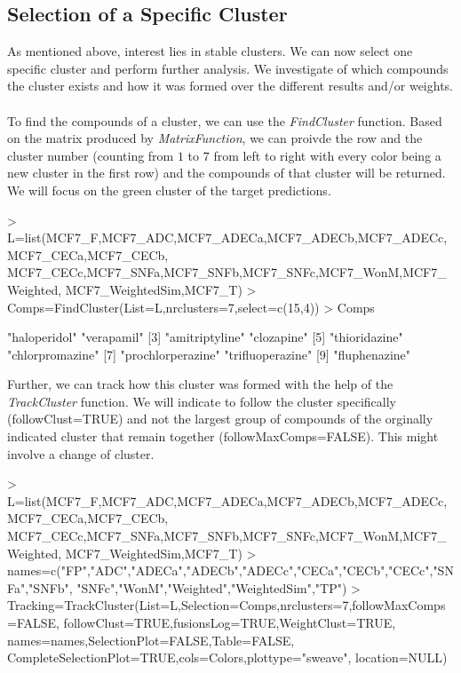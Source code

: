 \documentclass[a4paper]{article}
\begin{document}
\subsection{Selection of a Specific Cluster}
As mentioned above, interest lies in stable clusters. We can now select one
specific cluster and perform further analysis. We investigate of which compounds
the cluster exists and how it was formed over the different results and/or
weights.\\ \\
To find the compounds of a cluster, we can use the {\it FindCluster} function.
Based on the matrix produced by {\it MatrixFunction}, we can proivde the row and
the cluster number (counting from $1$ to $7$ from left to right with every color
being a new cluster in the first row) and the compounds of that cluster will be
returned. We will focus on the green cluster of the target predictions.
\begin{Schunk}
\begin{Sinput}
> L=list(MCF7_F,MCF7_ADC,MCF7_ADECa,MCF7_ADECb,MCF7_ADECc,MCF7_CECa,MCF7_CECb,
        MCF7_CECc,MCF7_SNFa,MCF7_SNFb,MCF7_SNFc,MCF7_WonM,MCF7_Weighted,
        MCF7_WeightedSim,MCF7_T)
> Comps=FindCluster(List=L,nrclusters=7,select=c(15,4))
> Comps
\end{Sinput}
\begin{Soutput}
[1] "haloperidol"      "verapamil"       
[3] "amitriptyline"    "clozapine"       
[5] "thioridazine"     "chlorpromazine"  
[7] "prochlorperazine" "trifluoperazine" 
[9] "fluphenazine"    
\end{Soutput}
\end{Schunk}
Further, we can track how this cluster was formed with the help of the {\it
TrackCluster} function. We will indicate to follow the cluster
specifically (followClust=TRUE) and not the largest group of compounds of the
orginally indicated cluster that remain together (followMaxComps=FALSE). This
might involve a change of cluster.
\begin{Schunk}
\begin{Sinput}
> L=list(MCF7_F,MCF7_ADC,MCF7_ADECa,MCF7_ADECb,MCF7_ADECc,MCF7_CECa,MCF7_CECb,
        MCF7_CECc,MCF7_SNFa,MCF7_SNFb,MCF7_SNFc,MCF7_WonM,MCF7_Weighted,
        MCF7_WeightedSim,MCF7_T)
> names=c("FP","ADC","ADECa","ADECb","ADECc","CECa","CECb","CECc","SNFa","SNFb",
 		"SNFc","WonM","Weighted","WeightedSim","TP")
> Tracking=TrackCluster(List=L,Selection=Comps,nrclusters=7,followMaxComps=FALSE,
                       followClust=TRUE,fusionsLog=TRUE,WeightClust=TRUE,
                       names=names,SelectionPlot=FALSE,Table=FALSE,
                       CompleteSelectionPlot=TRUE,cols=Colors,plottype="sweave",
                       location=NULL)
\end{Sinput}
\end{Schunk}
\end{document}
